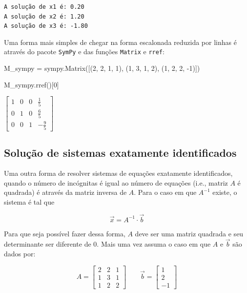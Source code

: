 \documentclass[
  brazilian,
  letterpaper,
  DIV=11,
  numbers=noendperiod]{scrreprt}
\newenvironment{Shaded}{\begin{snugshade}}{\end{snugshade}}
\newcommand{\DecValTok}[1]{\textcolor[rgb]{0.68,0.00,0.00}{#1}}
\newcommand{\NormalTok}[1]{\textcolor[rgb]{0.00,0.23,0.31}{#1}}
\newcommand{\OperatorTok}[1]{\textcolor[rgb]{0.37,0.37,0.37}{#1}}
\begin{document}
\begin{verbatim}
A solução de x1 é: 0.20
A solução de x2 é: 1.20
A solução de x3 é: -1.80
\end{verbatim}

Uma forma mais simples de chegar na forma escalonada reduzida por linhas
é através do pacote \texttt{SymPy} e das funções \texttt{Matrix} e
\texttt{rref}:

\begin{Shaded}
\begin{Highlighting}[]
\NormalTok{M\_sympy }\OperatorTok{=}\NormalTok{ sympy.Matrix([(}\DecValTok{2}\NormalTok{, }\DecValTok{2}\NormalTok{, }\DecValTok{1}\NormalTok{, }\DecValTok{1}\NormalTok{),}
\NormalTok{                        (}\DecValTok{1}\NormalTok{, }\DecValTok{3}\NormalTok{, }\DecValTok{1}\NormalTok{, }\DecValTok{2}\NormalTok{),}
\NormalTok{                        (}\DecValTok{1}\NormalTok{, }\DecValTok{2}\NormalTok{, }\DecValTok{2}\NormalTok{, }\OperatorTok{{-}}\DecValTok{1}\NormalTok{)])}

\NormalTok{M\_sympy.rref()[}\DecValTok{0}\NormalTok{]}
\end{Highlighting}
\end{Shaded}

$\displaystyle \left[\begin{matrix}1 & 0 & 0 & \frac{1}{5}\\0 & 1 & 0 & \frac{6}{5}\\0 & 0 & 1 & - \frac{9}{5}\end{matrix}\right]$

\subsection{Solução de sistemas exatamente
identificados}\label{soluuxe7uxe3o-de-sistemas-exatamente-identificados}

Uma outra forma de resolver sistemas de equações exatamente
identificados, quando o número de incógnitas é igual ao número de
equações (i.e., matriz \(A\) é quadrada) é através da matriz inversa de
\(A\). Para o caso em que \(A^{-1}\) existe, o sistema é tal que

\[ \vec{x} = A^{-1} \cdot \vec{b} \]

Para que seja possível fazer dessa forma, \(A\) deve ser uma matriz
quadrada e seu determinante ser diferente de \(0\). Mais uma vez assuma
o caso em que \(A\) e \(\vec{b}\) são dados por:

\[A = \begin{bmatrix} 2 & 2 & 1 \\ 1 & 3 & 1 \\ 1 & 2 & 2 \end{bmatrix} \quad \quad \vec{b} = \begin{bmatrix} 1 \\ 2 \\ -1 \end{bmatrix} \]
\end{document}
